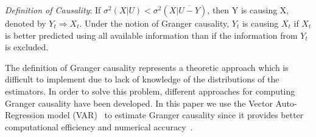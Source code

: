 \emph{Definition of Causality}: If $\sigma^2(X|U)<\sigma^2(X|\overline{U-Y})$, then Y is causing X, denoted by $Y_t \Rightarrow X_t$. Under the notion of Granger causality, $Y_t$ is causing $X_t$ if $X_t$ is better predicted using all available information than if the information from $Y_t$ is excluded.

The definition of Granger causality represents a theoretic approach which is difficult to implement due to lack of knowledge of the distributions of the estimators. In order to solve this problem, different approaches for computing Granger causality have been developed. In this paper we use the Vector Auto-Regression model (VAR)~\cite{barnett2014mvgc} to estimate Granger causality since it provides better computational efficiency and numerical accuracy~\cite{barnett2014mvgc}. 

